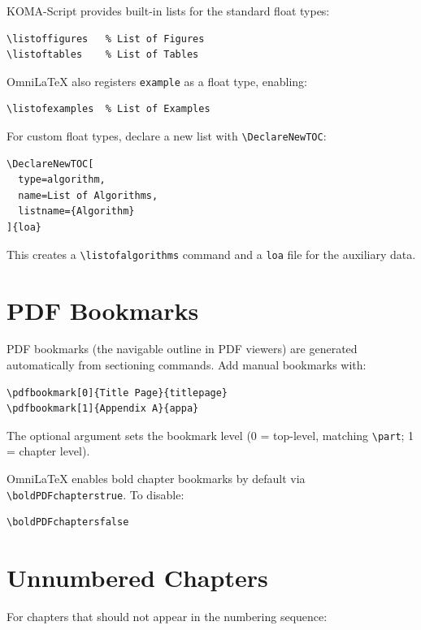 KOMA-Script provides built-in lists for the standard float types:

\begin{verbatim}
\listoffigures   % List of Figures
\listoftables    % List of Tables
\end{verbatim}

OmniLaTeX also registers \texttt{example} as a float type, enabling:

\begin{verbatim}
\listofexamples  % List of Examples
\end{verbatim}

For custom float types, declare a new list with \verb|\DeclareNewTOC|:

\begin{verbatim}
\DeclareNewTOC[
  type=algorithm,
  name=List of Algorithms,
  listname={Algorithm}
]{loa}
\end{verbatim}

This creates a \verb|\listofalgorithms| command and a \texttt{loa} file
for the auxiliary data.

\section{PDF Bookmarks}

PDF bookmarks (the navigable outline in PDF viewers) are generated
automatically from sectioning commands.  Add manual bookmarks with:

\begin{verbatim}
\pdfbookmark[0]{Title Page}{titlepage}
\pdfbookmark[1]{Appendix A}{appa}
\end{verbatim}

The optional argument sets the bookmark level (0 = top-level, matching
\verb|\part|; 1 = chapter level).

OmniLaTeX enables bold chapter bookmarks by default via
\verb|\boldPDFchapterstrue|.  To disable:

\begin{verbatim}
\boldPDFchaptersfalse
\end{verbatim}

\section{Unnumbered Chapters}

For chapters that should not appear in the numbering sequence:

